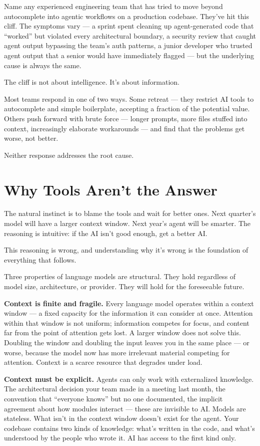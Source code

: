 \documentclass[
  a4paper,
  DIV=11,
  numbers=noendperiod]{scrreprt}
\begin{document}
Name any experienced engineering team that has tried to move beyond
autocomplete into agentic workflows on a production codebase. They've
hit this cliff. The symptoms vary --- a sprint spent cleaning up
agent-generated code that ``worked'' but violated every architectural
boundary, a security review that caught agent output bypassing the
team's auth patterns, a junior developer who trusted agent output that a
senior would have immediately flagged --- but the underlying cause is
always the same.

The cliff is not about intelligence. It's about information.

Most teams respond in one of two ways. Some retreat --- they restrict AI
tools to autocomplete and simple boilerplate, accepting a fraction of
the potential value. Others push forward with brute force --- longer
prompts, more files stuffed into context, increasingly elaborate
workarounds --- and find that the problems get worse, not better.

Neither response addresses the root cause.

\section{Why Tools Aren't the Answer}\label{why-tools-arent-the-answer}

The natural instinct is to blame the tools and wait for better ones.
Next quarter's model will have a larger context window. Next year's
agent will be smarter. The reasoning is intuitive: if the AI isn't good
enough, get a better AI.

This reasoning is wrong, and understanding why it's wrong is the
foundation of everything that follows.

Three properties of language models are structural. They hold regardless
of model size, architecture, or provider. They will hold for the
foreseeable future.

\textbf{Context is finite and fragile.} Every language model operates
within a context window --- a fixed capacity for the information it can
consider at once. Attention within that window is not uniform;
information competes for focus, and content far from the point of
attention gets lost. A larger window does not solve this. Doubling the
window and doubling the input leaves you in the same place --- or worse,
because the model now has more irrelevant material competing for
attention. Context is a scarce resource that degrades under load.

\textbf{Context must be explicit.} Agents can only work with
externalized knowledge. The architectural decision your team made in a
meeting last month, the convention that ``everyone knows'' but no one
documented, the implicit agreement about how modules interact --- these
are invisible to AI. Models are stateless. What isn't in the context
window doesn't exist for the agent. Your codebase contains two kinds of
knowledge: what's written in the code, and what's understood by the
people who wrote it. AI has access to the first kind only.
\end{document}
